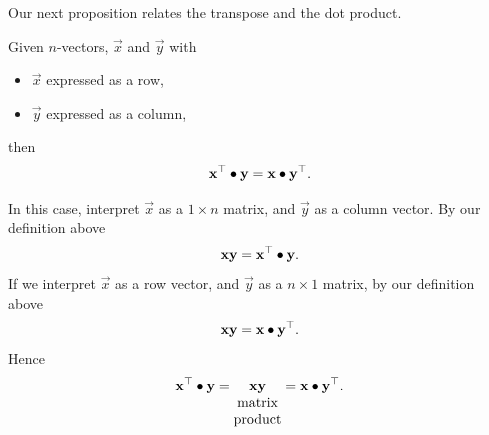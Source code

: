 \documentclass{ximera}
\begin{document}
Our next proposition relates the transpose and the dot product.


\begin{proposition}
  Given $n$-vectors, $\vec{x}$ and $\vec y$ with
  \begin{itemize}
  \item $\vec{x}$ expressed as a row,
  \item $\vec{y}$ expressed as a column,
  \end{itemize}
  then
  \[
    \mathbf{x}^\top\bullet \mathbf{y} = \mathbf{x}\bullet\mathbf{y}^\top.
  \]

  \begin{explanation}
    In this case, interpret $\vec{x}$ as a $1\times n$ matrix, and
    $\vec{y}$ as a column vector. By our definition above
    \[
    \mathbf{x}\mathbf{y} = \mathbf{x}^\top\bullet \mathbf{y}.
    \]
    If we interpret $\vec{x}$ as a row vector, and
    $\vec{y}$ as a $n\times 1$ matrix, by our definition above
    \[
    \mathbf{x}\mathbf{y} = \mathbf{x}\bullet\mathbf{y}^\top.
    \]
    Hence
    \[
      \mathbf{x}^\top\bullet \mathbf{y} = \underset{\begin{matrix}\text{matrix}\\\text{product}\end{matrix}}{\mathbf{x}\mathbf{y}} = \mathbf{x}\bullet\mathbf{y}^\top.
    \]
  \end{explanation}
\end{proposition}
\end{document}
